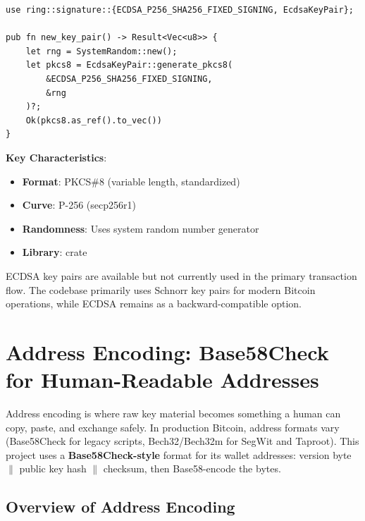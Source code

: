 \begin{listing}[htbp]
\caption{ECDSA P-256 key pair generation ()}
\label{lst:ch08-ecdsa-keypair-gen}
\begin{verbatim}
use ring::signature::{ECDSA_P256_SHA256_FIXED_SIGNING, EcdsaKeyPair};

pub fn new_key_pair() -> Result<Vec<u8>> {
    let rng = SystemRandom::new();
    let pkcs8 = EcdsaKeyPair::generate_pkcs8(
        &ECDSA_P256_SHA256_FIXED_SIGNING,
        &rng
    )?;
    Ok(pkcs8.as_ref().to_vec())
}
\end{verbatim}
\end{listing}

\needspace{2.5in}
\textbf{Key Characteristics}:
\begin{itemize}
  \item \textbf{Format}: PKCS\#8 (variable length, standardized)
  \item \textbf{Curve}: P-256 (secp256r1)
  \item \textbf{Randomness}: Uses system random number generator
  \item \textbf{Library}:  crate
\end{itemize}

ECDSA key pairs are available but not currently used in the primary transaction flow. The codebase primarily uses Schnorr key pairs for modern Bitcoin operations, while ECDSA remains as a backward-compatible option.

\section{Address Encoding: Base58Check for Human-Readable Addresses}
\label{sec:ch08-address-encoding}

Address encoding is where raw key material becomes something a human can copy, paste, and exchange safely. In production Bitcoin, address formats vary (Base58Check for legacy scripts, Bech32/Bech32m for SegWit and Taproot). This project uses a \textbf{Base58Check-style} format for its wallet addresses: version byte $\parallel$ public key hash $\parallel$ checksum, then Base58-encode the bytes.

\subsection{Overview of Address Encoding}
\label{sec:ch08-address-overview}

